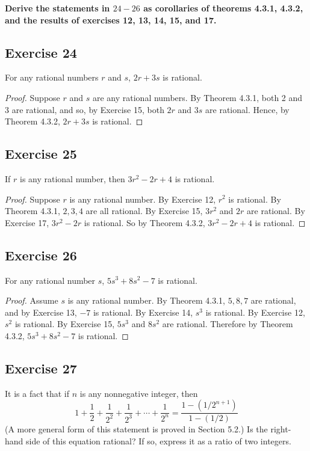 \documentclass[14pt]{extarticle}
\newcommand{\cy}{\color{cyan}}
\begin{document}
{\bf \cy Derive the statements in $24-26$ as corollaries of theorems 4.3.1, 4.3.2, and the results of exercises 12, 13, 14, 15, and 17.}

\subsection{Exercise 24}
For any rational numbers $r$ and $s$, $2r + 3s$ is rational.

\begin{proof}
Suppose $r$ and $s$ are any rational numbers. By Theorem 4.3.1, both 2 and 3 are rational, and so, by Exercise 15, both $2r$ and $3s$ are rational. Hence, by Theorem 4.3.2, $2r + 3s$ is rational. 
\end{proof}

\subsection{Exercise 25}
If $r$ is any rational number, then $3r^2 - 2r + 4$ is
rational.

\begin{proof}
Suppose $r$ is any rational number. By Exercise 12, $r^2$ is rational. By Theorem 4.3.1, $2, 3,4$ are all rational. By Exercise 15, $3r^2$ and $2r$ are rational. By Exercise 17, $3r^2-2r$ is rational. So by Theorem 4.3.2, $3r^2-2r+4$ is rational.
\end{proof}

\subsection{Exercise 26}
For any rational number $s$, $5s^3 + 8s^2 - 7$ is rational.

\begin{proof}
Assume $s$ is any rational number. By Theorem 4.3.1, $5, 8, 7$ are rational, and by Exercise 13, $-7$ is rational. By Exercise 14, $s^3$ is rational. By Exercise 12, $s^2$ is rational. By Exercise 15, $5s^3$ and $8s^2$ are rational. Therefore by Theorem 4.3.2, $5s^3 + 8s^2 - 7$ is rational. 
\end{proof}

\subsection{Exercise 27}
It is a fact that if $n$ is any nonnegative integer, then
\[
1 + \frac{1}{2} + \frac{1}{2^2} + \frac{1}{2^3} + \cdots + \frac{1}{2^n} = \frac{1-(1/2^{n+1})}{1-(1/2)}
\]
(A more general form of this statement is proved in Section 5.2.) Is the right-hand side of this equation rational? If so, express it as a ratio of two integers.
\end{document}
